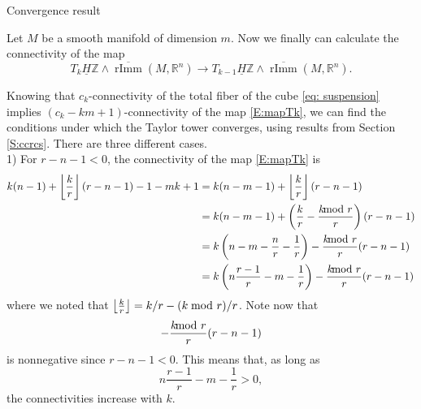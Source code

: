 \documentclass[12pt]{amsart}
\newcommand{\R}{{\mathbb R}}
\newcommand{\Z}{{\mathbb Z}}
\newcommand{\rImm}{\operatorname{rImm}}
\newcommand{\rbar}{\overline{\rImm}}
\newcommand{\HZ}{\underline{H}\Z}
\theoremstyle{plain}
\theoremstyle{definition}
\theoremstyle{remark}
\begin{document}
\begin{section}{Convergence result}\label{convergenceresult}

Let $M$ be a smooth manifold of dimension $m$. Now we finally can calculate the connectivity of the map
\begin{equation}\label{E:mapTk}
T_k \HZ\wedge \rbar(M,\R^n)\to T_{k-1}\HZ\wedge \rbar(M,\R^n).
\end{equation}

Knowing that $c_k$-connectivity of the total fiber of the cube \eqref{eq: suspension} implies $(c_k-km+1)$-connectivity of the map \eqref{E:mapTk}, we can find the conditions under which the Taylor tower converges, using results from Section \ref{S:ccrcs}. There are three different cases.\\

1) For $r-n-1<0$, the connectivity of the map \eqref{E:mapTk} is
\begin{equation}\label{E:Conn:r-n-1<0}
\begin{aligned}
k(n-1)+\left\lfloor \frac{k}{r}\right\rfloor(r-n-1)-1-mk+1 &= k(n-m-1)+\left\lfloor \frac{k}{r}\right\rfloor(r-n-1)\\
&=  k(n-m-1)+ \left(\frac{k}{r}-\frac{k\hspace{-8pt}\mod r}{r}\right) (r-n-1)\\
&= k\left(n-m-\frac{n}{r}-\frac{1}{r}\right)-\frac{k\hspace{-8pt}\mod r}{r} (r-n-1)\\
&= k\left(n\frac{r-1}{r}-m-\frac{1}{r}\right)-\frac{k\hspace{-8pt}\mod r}{r} (r-n-1)
\end{aligned}
\end{equation}
where we noted that $\left\lfloor \frac{k}{r}\right\rfloor = k/r - (k\hspace{-4pt}\mod r)/r$.
Note now that
$$
-\frac{k\hspace{-8pt}\mod r}{r} (r-n-1)
$$
is nonnegative since $r-n-1<0$.
This means that, as long as
$$
n\frac{r-1}{r}-m-\frac{1}{r} >0,
$$
the connectivities increase with $k$.\\


\end{section}
\end{document}

